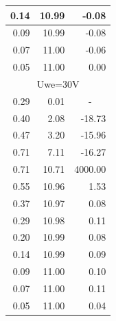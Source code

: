 \documentclass[a4paper,12pt]{article}
\begin{document}
\begin{table}[h]
\begin{tabular}{|r|r|r|}
0.14                              & 10.99                           & -0.08                                \\ \hline
0.09                              & 10.99                           & -0.08                                \\ \hline
0.07                              & 11.00                           & -0.06                                \\ \hline
0.05                              & 11.00                           & 0.00                                 \\ \hline
\multicolumn{3}{|c|}{Uwe=30V}                                                                              \\ \hline
0.29                              & 0.01                            & \multicolumn{1}{c|}{-}               \\ \hline
0.40                              & 2.08                            & -18.73                               \\ \hline
0.47                              & 3.20                            & -15.96                               \\ \hline
0.71                              & 7.11                            & -16.27                               \\ \hline
0.71                              & 10.71                           & 4000.00                              \\ \hline
0.55                              & 10.96                           & 1.53                                 \\ \hline
0.37                              & 10.97                           & 0.08                                 \\ \hline
0.29                              & 10.98                           & 0.11                                 \\ \hline
0.20                              & 10.99                           & 0.08                                 \\ \hline
0.14                              & 10.99                           & 0.09                                 \\ \hline
0.09                              & 11.00                           & 0.10                                 \\ \hline
0.07                              & 11.00                           & 0.11                                 \\ \hline
0.05                              & 11.00                           & 0.04                                 \\ \hline
\end{tabular}
\end{table}
\pagebreak
\end{document}
